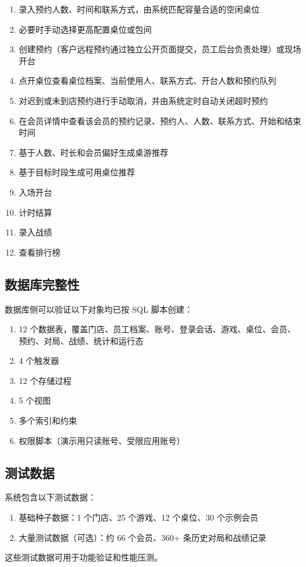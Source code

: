 \begin{enumerate}
  \item 录入预约人数、时间和联系方式，由系统匹配容量合适的空闲桌位
  \item 必要时手动选择更高配置桌位或包间
  \item 创建预约（客户远程预约通过独立公开页面提交，员工后台负责处理）或现场开台
  \item 点开桌位查看桌位档案、当前使用人、联系方式、开台人数和预约队列
  \item 对迟到或未到店预约进行手动取消，并由系统定时自动关闭超时预约
  \item 在会员详情中查看该会员的预约记录、预约人、人数、联系方式、开始和结束时间
  \item 基于人数、时长和会员偏好生成桌游推荐
  \item 基于目标时段生成可用桌位推荐
  \item 入场开台
  \item 计时结算
  \item 录入战绩
  \item 查看排行榜
\end{enumerate}

\subsection{数据库完整性}

数据库侧可以验证以下对象均已按 SQL 脚本创建：

\begin{enumerate}
  \item 12 个数据表，覆盖门店、员工档案、账号、登录会话、游戏、桌位、会员、预约、对局、战绩、统计和运行态
  \item 4 个触发器
  \item 12 个存储过程
  \item 5 个视图
  \item 多个索引和约束
  \item 权限脚本（演示用只读账号、受限应用账号）
\end{enumerate}

\subsection{测试数据}

系统包含以下测试数据：

\begin{enumerate}
  \item 基础种子数据：1 个门店、25 个游戏、12 个桌位、30 个示例会员
  \item 大量测试数据（可选）：约 66 个会员、360+ 条历史对局和战绩记录
\end{enumerate}

这些测试数据可用于功能验证和性能压测。
